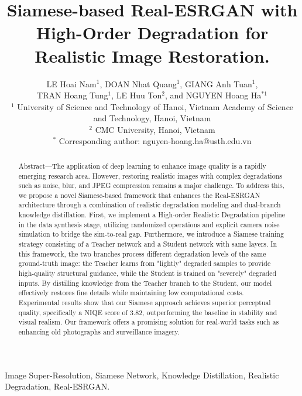 \documentclass[conference]{IEEEtran}
\begin{document}
\title{
Siamese-based Real-ESRGAN with High-Order Degradation for Realistic Image Restoration.
}

\author{
LE Hoai Nam$^{1}$, DOAN Nhat Quang$^{1}$, GIANG Anh Tuan$^{1}$,\\
TRAN Hoang Tung$^{1}$, LE Huu Ton$^{2}$, and NGUYEN Hoang Ha$^{*1}$\\[0.5em]
\small
$^{1}$ University of Science and Technology of Hanoi, Vietnam Academy of Science and Technology, Hanoi, Vietnam\\
$^{2}$ CMC University, Hanoi, Vietnam\\
$^{*}$ Corresponding author: nguyen-hoang.ha@usth.edu.vn
}

\maketitle

\begin{abstract}
Abstract—The application of deep learning to enhance image quality is a rapidly emerging research area. However, restoring realistic images with complex degradations such as noise, blur, and JPEG compression remains a major challenge. To address this, we propose a novel Siamese-based framework that enhances the Real-ESRGAN architecture through a combination of realistic degradation modeling and dual-branch knowledge distillation. First, we implement a High-order Realistic Degradation pipeline in the data synthesis stage, utilizing randomized operations and explicit camera noise simulation to bridge the sim-to-real gap. Furthermore, we introduce a Siamese training strategy consisting of a Teacher network and a Student network with same layers. In this framework, the two branches process different degradation levels of the same ground-truth image: the Teacher learns from "lightly" degraded samples to provide high-quality structural guidance, while the Student is trained on "severely" degraded inputs. By distilling knowledge from the Teacher branch to the Student, our model effectively restores fine details while maintaining low computational costs. Experimental results show that our Siamese approach achieves superior perceptual quality, specifically a NIQE score of 3.82, outperforming the baseline in stability and visual realism. Our framework offers a promising solution for real-world tasks such as enhancing old photographs and surveillance imagery.
\end{abstract}

\begin{IEEEkeywords}
Image Super-Resolution, Siamese Network, Knowledge Distillation, Realistic Degradation, Real-ESRGAN.
\end{IEEEkeywords}
\end{document}
